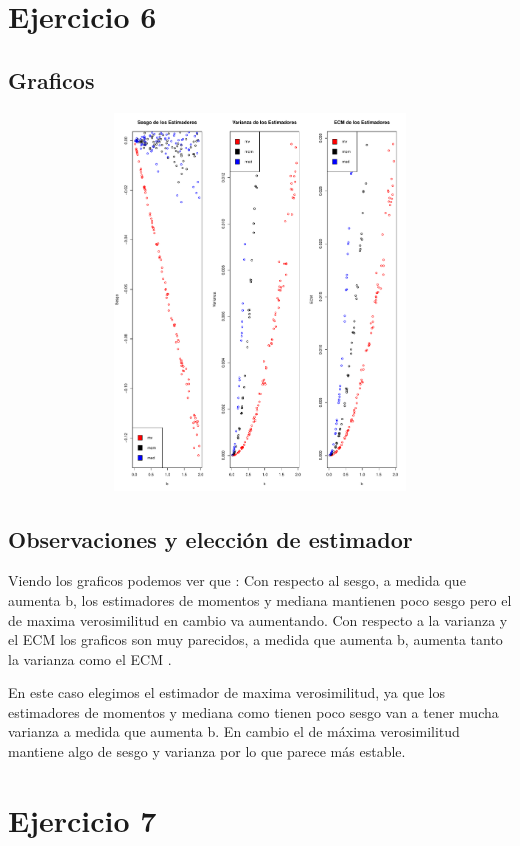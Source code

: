 \documentclass[a4paper]{article}
\begin{document}
\section{Ejercicio 6}
\subsection{Graficos}
\begin{figure}[H]
	\centering
	\includegraphics[width=15cm, height=10cm]{Ejercicio-6-plot}
\end{figure}

\subsection{Observaciones y elección de estimador}
Viendo los graficos podemos ver que : \newline
Con respecto al sesgo, a medida que aumenta b, los estimadores de momentos y mediana mantienen poco sesgo pero el de maxima verosimilitud en cambio va aumentando. \newline
Con respecto a la varianza y el ECM los graficos son muy parecidos, a medida que aumenta b, aumenta tanto la varianza como el ECM . \newline

En este caso elegimos el estimador de maxima verosimilitud, ya que los estimadores de momentos y mediana como tienen poco sesgo van a tener mucha varianza a medida que aumenta b. En cambio el de máxima verosimilitud mantiene algo de sesgo y varianza por lo que parece más estable.

\section{Ejercicio 7}
\end{document}
